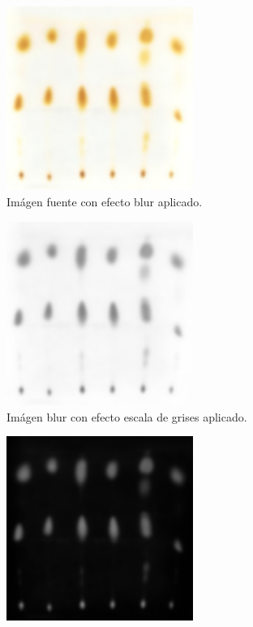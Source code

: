 \begin{itemize}
\begin{figure}[H]
	  \vspace{-0.2cm}
	  \centering
	  \includegraphics[width=230px]{imagenes-jtlc/experimento/search-samples/1-blur}
	  \centering
	  \vspace{-0.4cm}
	  \caption{Im\'agen fuente con efecto blur aplicado.}
	  \label{fig:font-c-blur}
	  \vspace{-0.15cm}
	\end{figure}
	\begin{figure}[H]
	  \vspace{-0.2cm}
	  \centering
	  \includegraphics[width=230px]{imagenes-jtlc/experimento/search-samples/2-gray}
	  \centering
	  \vspace{-0.4cm}
	  \caption{Im\'agen blur con efecto escala de grises aplicado.}
	  \label{fig:font-c-gray}
	  \vspace{-0.15cm}
	\end{figure}
	\begin{figure}[H]
	  \vspace{-0.2cm}
	  \centering
	  \includegraphics[width=230px]{imagenes-jtlc/experimento/search-samples/3-invert}

\end{figure}
\end{itemize}
